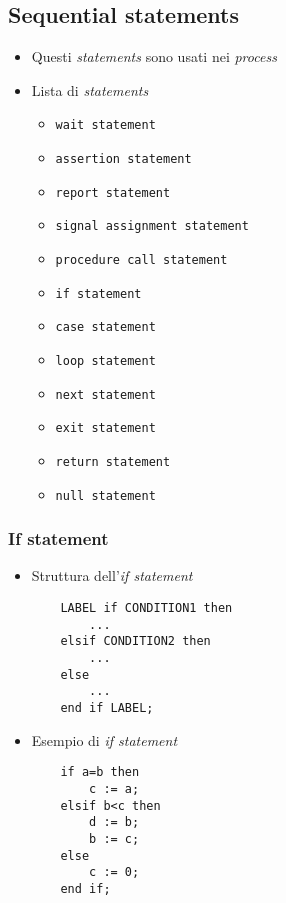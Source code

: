 \documentclass{article}
\begin{document}
\subsection{Sequential statements}
\begin{itemize}
  \item Questi \textit{statements} sono usati nei \textit{process}
  \item Lista di \textit{statements}
        \begin{itemize}
          \item \texttt{wait statement}
          \item \texttt{assertion statement}
          \item \texttt{report statement}
          \item \texttt{signal assignment statement}
          \item \texttt{procedure call statement}
          \item \texttt{if statement}
          \item \texttt{case statement}
          \item \texttt{loop statement}
          \item \texttt{next statement}
          \item \texttt{exit statement}
          \item \texttt{return statement}
          \item \texttt{null statement}
        \end{itemize}
\end{itemize}
\subsubsection{If statement}
\begin{itemize}
  \item Struttura dell'\textit{if statement}
        \begin{verbatim}
    LABEL if CONDITION1 then
        ...
    elsif CONDITION2 then
        ...
    else
        ...
    end if LABEL;
	      \end{verbatim}
  \item Esempio di \textit{if statement}
        \begin{verbatim}
    if a=b then
        c := a;
    elsif b<c then
        d := b;
        b := c;
    else
        c := 0;
    end if;
	      \end{verbatim}
\end{itemize}
\end{document}
